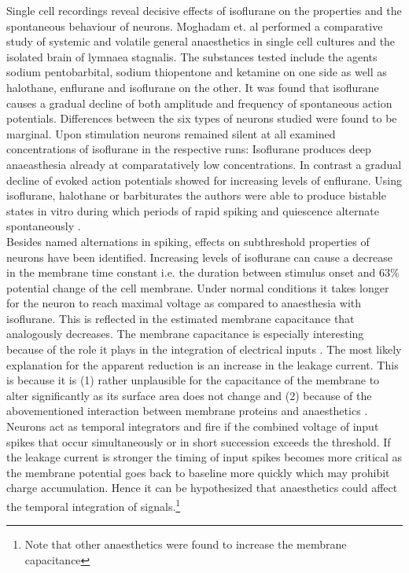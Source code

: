 Single cell recordings reveal decisive effects of isoflurane on the properties and the spontaneous behaviour of neurons. Moghadam et. al \parencite*{moghadam2019comparative} performed a comparative study of systemic and volatile general anaesthetics in single cell cultures and the isolated brain of lymnaea stagnalis. The substances tested include the agents sodium pentobarbital, sodium thiopentone and ketamine on one side as well as halothane, enflurane and isoflurane on the other. It was found that isoflurane causes a gradual decline of both amplitude and frequency of spontaneous action potentials. Differences between the six types of neurons studied were found to be marginal. Upon stimulation neurons remained silent at all examined concentrations of isoflurane in the respective runs: Isoflurane produces deep anaeasthesia already at comparatatively low concentrations. In contrast a gradual decline of evoked action potentials showed for increasing levels of enflurane. Using isoflurane, halothane or barbiturates the authors were able to produce bistable states in vitro during which periods of rapid spiking and quiescence alternate spontaneously \parencite{moghadam2019comparative}.\\
Besides named alternations in spiking, effects on subthreshold properties of neurons have been identified. Increasing levels of isoflurane can cause a decrease in the membrane time constant i.e. the duration between stimulus onset and 63\% potential change of the cell membrane. Under normal conditions it takes longer for the neuron to reach maximal voltage as compared to anaesthesia with isoflurane. This is reflected in the estimated membrane capacitance that analogously decreases. The membrane capacitance is especially interesting because of the role it plays in the integration of electrical inputs \parencite{golowasch2014}. The most likely explanation for the apparent reduction is an increase in the leakage current. This is because it is (1) rather unplausible for the capacitance of the membrane to alter significantly as its surface area does not change and (2) because of the abovementioned interaction between membrane proteins and anaesthetics \parencite{qazzaz2017modulation}. Neurons act as temporal integrators and fire if the combined voltage of input spikes that occur simultaneously or in short succession exceeds the threshold. If the leakage current is stronger the timing of input spikes becomes more critical as the membrane potential goes back to baseline more quickly which may prohibit charge accumulation. Hence it can be hypothesized that anaesthetics could affect the temporal integration of signals.\footnote{ Note that other anaesthetics were found to increase the membrane capacitance}\\

